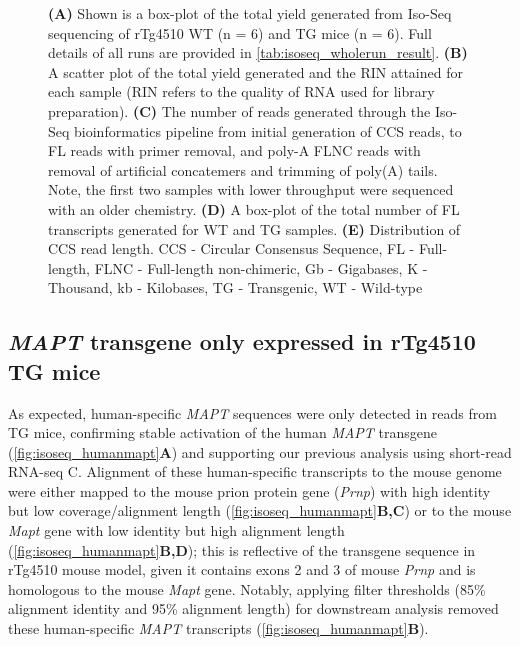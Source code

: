 \begin{figure}[p]
	\captionsetup{width=0.95\textwidth}
	\caption*{\textbf{(A)} Shown is a box-plot of the total yield generated from Iso-Seq sequencing of rTg4510 WT (n = 6) and TG mice (n = 6). Full details of all runs are provided in \cref{tab:isoseq_wholerun_result}. \textbf{(B)} A scatter plot of the total yield generated and the RIN attained for each sample (RIN refers to the quality of RNA used for library preparation). \textbf{(C)} The number of reads generated through the Iso-Seq bioinformatics pipeline from initial generation of CCS reads, to FL reads with primer removal, and poly-A FLNC reads with removal of artificial concatemers and trimming of poly(A) tails. Note, the first two samples with lower throughput were sequenced with an older chemistry. \textbf{(D)} A box-plot of the total number of FL transcripts generated for WT and TG samples. \textbf{(E)} Distribution of CCS read length. CCS - Circular Consensus Sequence, FL - Full-length, FLNC - Full-length non-chimeric, Gb - Gigabases, K - Thousand, kb - Kilobases, TG - Transgenic, WT - Wild-type}%
\end{figure}


\subsection{\textit{MAPT} transgene only expressed in rTg4510 TG mice}
\label{mapt_transgene_whole}
As expected, human-specific \textit{MAPT} sequences were only detected in reads from TG mice, confirming stable activation of the human \textit{MAPT} transgene (\cref{fig:isoseq_humanmapt}\textbf{A}) and supporting our previous analysis using short-read RNA-seq C\cite{Castanho2020}. Alignment of these human-specific transcripts to the mouse genome were either mapped to the mouse prion protein gene (\textit{Prnp}) with high identity but low coverage/alignment length (\cref{fig:isoseq_humanmapt}\textbf{B,C}) or to the mouse \textit{Mapt} gene with low identity but high alignment length (\cref{fig:isoseq_humanmapt}\textbf{B,D}); this is reflective of the transgene sequence in rTg4510 mouse model, given it contains exons 2 and 3 of mouse \textit{Prnp}\cite{Ramsden2005} and is homologous to the mouse \textit{Mapt} gene. Notably, applying filter thresholds (85\% alignment identity and 95\% alignment length) for downstream analysis removed these human-specific \textit{MAPT} transcripts (\cref{fig:isoseq_humanmapt}\textbf{B}). 

